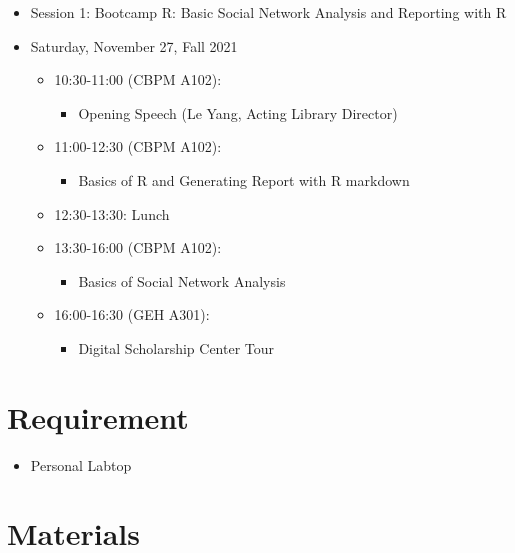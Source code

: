 \documentclass[
]{book}
\providecommand{\tightlist}{%
  \setlength{\itemsep}{0pt}\setlength{\parskip}{0pt}}
\begin{document}
\begin{itemize}
\tightlist
\item
  Session 1: Bootcamp R: Basic Social Network Analysis and Reporting with R
\item
  Saturday, November 27, Fall 2021

  \begin{itemize}
  \tightlist
  \item
    10:30-11:00 (CBPM A102):

    \begin{itemize}
    \tightlist
    \item
      Opening Speech (Le Yang, Acting Library Director)
    \end{itemize}
  \item
    11:00-12:30 (CBPM A102):

    \begin{itemize}
    \tightlist
    \item
      Basics of R and Generating Report with R markdown
    \end{itemize}
  \item
    12:30-13:30: Lunch
  \item
    13:30-16:00 (CBPM A102):

    \begin{itemize}
    \tightlist
    \item
      Basics of Social Network Analysis
    \end{itemize}
  \item
    16:00-16:30 (GEH A301):

    \begin{itemize}
    \tightlist
    \item
      Digital Scholarship Center Tour
    \end{itemize}
  \end{itemize}
\end{itemize}

\hypertarget{requirement}{%
\section{Requirement}\label{requirement}}

\begin{itemize}
\tightlist
\item
  Personal Labtop
\end{itemize}

\hypertarget{materials}{%
\section{Materials}\label{materials}}
\end{document}
